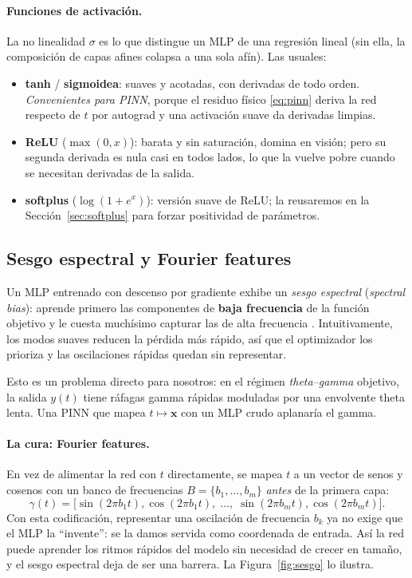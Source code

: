 \documentclass[11pt,a4paper]{article}
\newcommand{\x}{\mathbf{x}}
\begin{document}
\paragraph{Funciones de activación.} La no linealidad $\sigma$ es lo que distingue un MLP de una regresión lineal (sin ella, la composición de capas afines colapsa a una sola afín). Las usuales:
\begin{itemize}[nosep]
  \item \textbf{tanh} / \textbf{sigmoidea}: suaves y acotadas, con derivadas de todo orden. \emph{Convenientes para PINN}, porque el residuo físico \eqref{eq:pinn} deriva la red respecto de $t$ por autograd y una activación suave da derivadas limpias.
  \item \textbf{ReLU} ($\max(0,x)$): barata y sin saturación, domina en visión; pero su segunda derivada es nula casi en todos lados, lo que la vuelve pobre cuando se necesitan derivadas de la salida.
  \item \textbf{softplus} ($\log(1+e^x)$): versión suave de ReLU; la reusaremos en la Sección~\ref{sec:softplus} para forzar positividad de parámetros.
\end{itemize}

\subsection{Sesgo espectral y Fourier features}
Un MLP entrenado con descenso por gradiente exhibe un \emph{sesgo espectral} (\emph{spectral bias}): aprende primero las componentes de \textbf{baja frecuencia} de la función objetivo y le cuesta muchísimo capturar las de alta frecuencia \cite{tancik2020}. Intuitivamente, los modos suaves reducen la pérdida más rápido, así que el optimizador los prioriza y las oscilaciones rápidas quedan sin representar.

Esto es un problema directo para nosotros: en el régimen \emph{theta--gamma} objetivo, la salida $y(t)$ tiene ráfagas gamma rápidas moduladas por una envolvente theta lenta. Una PINN que mapea $t\mapsto\x$ con un MLP crudo aplanaría el gamma.

\paragraph{La cura: Fourier features.} En vez de alimentar la red con $t$ directamente, se mapea $t$ a un vector de senos y cosenos con un banco de frecuencias $B=\{b_1,\dots,b_m\}$ \emph{antes} de la primera capa:
\begin{equation}
  \gamma(t)=\big[\sin(2\pi b_1 t),\cos(2\pi b_1 t),\;\dots,\;\sin(2\pi b_m t),\cos(2\pi b_m t)\big].
\end{equation}
Con esta codificación, representar una oscilación de frecuencia $b_k$ ya no exige que el MLP la ``invente'': se la damos servida como coordenada de entrada. Así la red puede aprender los ritmos rápidos del modelo sin necesidad de crecer en tamaño, y el sesgo espectral deja de ser una barrera. La Figura~\ref{fig:sesgo} lo ilustra.
\end{document}
